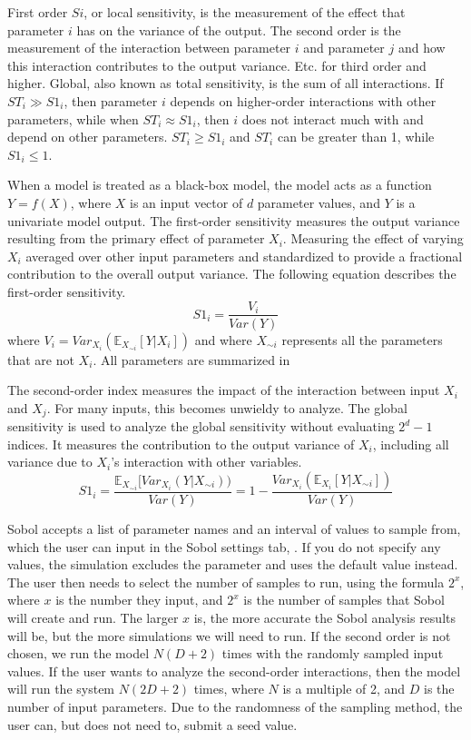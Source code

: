 First order $Si$, or local sensitivity, is the measurement of the effect that parameter $i$ has on the variance of the output. 
The second order is the measurement of the interaction between parameter $i$ and parameter $j$ and how this interaction contributes to the output variance. 
Etc. for third order and higher. 
Global, also known as total sensitivity, is the sum of all interactions. 
If $ST_i \gg S1_i$, then parameter $i$ depends on higher-order interactions with other parameters, while when $ST_i \approx S1_i$, then $i$ does not interact much with and depend on other parameters.
$ST_i \geq S1_i$ and $ST_i$ can be greater than 1, while $S1_i \leq 1$. 

When a model is treated as a black-box model, the model acts as a function $Y=f(X)$, where $X$ is an input vector of $d$ parameter values, and $Y$ is a univariate model output.
The first-order sensitivity measures the output variance resulting from the primary effect of parameter $X_i$.
Measuring the effect of varying $X_i$ averaged over other input parameters and standardized to provide a fractional contribution to the overall output variance.
The following equation describes the first-order sensitivity. 
\[
 S1_i = \frac{V_i}{\textit{Var}(Y)}
\] where $V_i = \textit{Var}_{X_i}(\mathbb{E}_{X_{\sim i}}[Y|X_i])$ and where $X_{\sim i}$ represents all the parameters that are not $X_i$.
All parameters are summarized in 

The second-order index measures the impact of the interaction between input $X_i$ and $X_j$. 
For many inputs, this becomes unwieldy to analyze.
The global sensitivity is used to analyze the global sensitivity without evaluating $2^d-1$ indices. 
It measures the contribution to the output variance of $X_i$, including all variance due to $ X_i$'s interaction with other variables.
\[
 S1_i = \frac{\mathbb{E}_{X_{\sim i}}[\textit{Var}_{X_i}(Y|X_{\sim i}))}{\textit{Var}(Y)} = 1 - \frac{\textit{Var}_{X_i}(\mathbb{E}_{X_i}[Y|X_{\sim i}])}{\textit{Var}(Y)}
\]

Sobol accepts a list of parameter names and an interval of values to sample from, which the user can input in the Sobol settings tab, . 
If you do not specify any values, the simulation excludes the parameter and uses the default value instead.
The user then needs to select the number of samples to run, using the formula $2^x$, where $x$ is the number they input, and $2^x$ is the number of samples that Sobol will create and run.
The larger $x$ is, the more accurate the Sobol analysis results will be, but the more simulations we will need to run. 
If the second order is not chosen, we run the model $N(D+2)$ times with the randomly sampled input values. 
If the user wants to analyze the second-order interactions, then the model will run the system $N(2D+2)$ times, where $N$ is a multiple of 2, and $D$ is the number of input parameters.
Due to the randomness of the sampling method, the user can, but does not need to, submit a seed value. 

